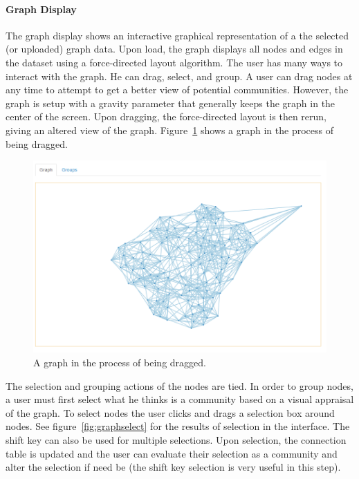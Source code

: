 \documentclass{article}\usepackage[]{graphicx}\usepackage[]{color}
\begin{document}
\paragraph{Graph Display}
The graph display shows an interactive graphical representation of a the selected (or uploaded) graph data. Upon load, the graph displays all nodes and edges in the dataset using a force-directed layout algorithm. The user has many ways to interact with the graph. He can drag, select, and group. A user can drag nodes at any time to attempt to get a better view of potential communities. However, the graph is setup with a gravity parameter that generally keeps the graph in the center of the screen. Upon dragging, the force-directed layout is then rerun, giving an altered view of the graph. Figure~\ref{fig:graphdrag} shows a graph in the process of being dragged.

\begin{figure}[hbtp]
\centering
\includegraphics[width=\textwidth]{images/graphdrag.png}
\caption{\label{fig:graphdrag} A graph in the process of being dragged.}
\end{figure}

The selection and grouping actions of the nodes are tied. In order to group nodes, a user must first select what he thinks is a community based on a visual appraisal of the graph. To select nodes the user clicks and drags a selection box around nodes. See figure~\ref{fig:graphselect} for the results of selection in the interface. The shift key can also be used for multiple selections. Upon selection, the connection table is updated and the user can evaluate their selection as a community and alter the selection if need be (the shift key selection is very useful in this step).
\end{document}
